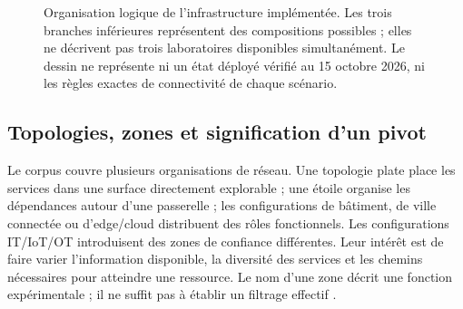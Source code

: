 \documentclass[11pt,a4paper]{article}
\begin{document}
\begin{figure}[H]
\centering
{}
\caption{Organisation logique de l'infrastructure implémentée. Les trois
branches inférieures représentent des compositions possibles ; elles ne
décrivent pas trois laboratoires disponibles simultanément. Le dessin ne
représente ni un état déployé vérifié au 15 octobre 2026, ni les règles exactes
de connectivité de chaque scénario.}
\label{fig:net-laboratoire}
\end{figure}

\subsection{Topologies, zones et signification d'un pivot}

Le corpus couvre plusieurs organisations de réseau. Une topologie plate place
les services dans une surface directement explorable ; une étoile organise les
dépendances autour d'une passerelle ; les configurations de bâtiment, de ville
connectée ou d'edge/cloud distribuent des rôles fonctionnels. Les configurations
IT/IoT/OT introduisent des zones de confiance différentes. Leur intérêt est de
faire varier l'information disponible, la diversité des services et les chemins
nécessaires pour atteindre une ressource. Le nom d'une zone décrit une fonction
expérimentale ; il ne suffit pas à établir un filtrage effectif
\cite{net-scenarios,net-attacks}.
\end{document}
